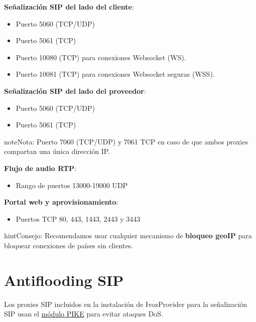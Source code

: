 \documentclass[letterpaper,10pt,spanish]{sphinxmanual}
\begin{document}
\textbf{Señalización SIP del lado del cliente}:
\begin{itemize}
\item {} 
Puerto 5060 (TCP/UDP)

\item {} 
Puerto 5061 (TCP)

\item {} 
Puerto 10080 (TCP) para conexiones Websocket (WS).

\item {} 
Puerto 10081 (TCP) para conexiones Websocket seguras (WSS).

\end{itemize}

\textbf{Señalización SIP del lado del proveedor}:
\begin{itemize}
\item {} 
Puerto 5060 (TCP/UDP)

\item {} 
Puerto 5061 (TCP)

\end{itemize}

\begin{notice}{note}{Nota:}
Puerto 7060 (TCP/UDP) y 7061 TCP en caso de que ambos proxies compartan una única dirección IP.
\end{notice}

\textbf{Flujo de audio RTP}:
\begin{itemize}
\item {} 
Rango de puertos 13000-19000 UDP

\end{itemize}

\textbf{Portal web y aprovisionamiento}:
\begin{itemize}
\item {} 
Puertos TCP 80, 443, 1443, 2443 y 3443

\end{itemize}

\begin{notice}{hint}{Consejo:}
Recomendamos usar cualquier mecanismo de \textbf{bloqueo geoIP} para bloquear conexiones de países sin clientes.
\end{notice}


\section{Antiflooding SIP}
\label{security_and_maintenance/security/antiflooding::doc}\label{security_and_maintenance/security/antiflooding:sip-antiflooding}\label{security_and_maintenance/security/antiflooding:id1}
Los proxies SIP incluidos en la instalación de IvozProvider para la señalización SIP usan el \href{http://kamailio.org/docs/modules/5.1.x/modules/pike.html}{módulo PIKE} para evitar ataques DoS.
\end{document}
